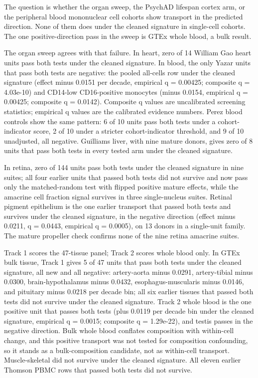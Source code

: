 \documentclass[11pt]{article}
\begin{document}
The question is whether the organ sweep, the PsychAD lifespan cortex arm, or the peripheral blood mononuclear cell cohorts show transport in the predicted direction. None of them does under the cleaned signature in single-cell cohorts. The one positive-direction pass in the sweep is GTEx whole blood, a bulk result.

The organ sweep agrees with that failure. In heart, zero of 14 William Gao heart units pass both tests under the cleaned signature. In blood, the only Yazar units that pass both tests are negative: the pooled all-cells row under the cleaned signature (effect minus 0.0151 per decade, empirical q = 0.00425; composite q = 4.03e-10) and CD14-low CD16-positive monocytes (minus 0.0154, empirical q = 0.00425; composite q = 0.0142). Composite q values are uncalibrated screening statistics; empirical q values are the calibrated evidence numbers. Perez blood controls show the same pattern: 6 of 10 units pass both tests under a cohort-indicator score, 2 of 10 under a stricter cohort-indicator threshold, and 9 of 10 unadjusted, all negative. Guilliams liver, with nine mature donors, gives zero of 8 units that pass both tests in every tested arm under the cleaned signature.

In retina, zero of 144 units pass both tests under the cleaned signature in nine suites; all four earlier units that passed both tests did not survive and now pass only the matched-random test with flipped positive mature effects, while the amacrine cell fraction signal survives in three single-nucleus suites. Retinal pigment epithelium is the one earlier transport that passed both tests and survives under the cleaned signature, in the negative direction (effect minus 0.0211, q = 0.0443, empirical q = 0.0005), on 13 donors in a single-unit family. The mature propeller check confirms none of the nine retina amacrine suites.

Track 1 scores the 47-tissue panel; Track 2 scores whole blood only. In GTEx bulk tissue, Track 1 gives 5 of 47 units that pass both tests under the cleaned signature, all new and all negative: artery-aorta minus 0.0291, artery-tibial minus 0.0300, brain-hypothalamus minus 0.0432, esophagus-muscularis minus 0.0146, and pituitary minus 0.0218 per decade bin; all six earlier tissues that passed both tests did not survive under the cleaned signature. Track 2 whole blood is the one positive unit that passes both tests (plus 0.0119 per decade bin under the cleaned signature, empirical q = 0.0015; composite q = 1.29e-22), and testis passes in the negative direction. Bulk whole blood conflates composition with within-cell change, and this positive transport was not tested for composition confounding, so it stands as a bulk-composition candidate, not as within-cell transport. Muscle-skeletal did not survive under the cleaned signature. All eleven earlier Thomson PBMC rows that passed both tests did not survive.
\end{document}
